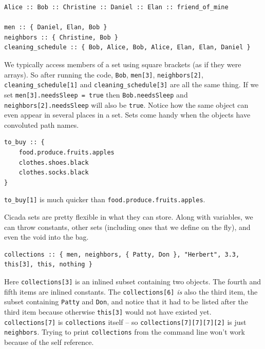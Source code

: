 \documentclass{article}
\newenvironment{code}{
       \begin{list}{}{
               \setlength{\leftmargin}{.4in}
               \setlength{\rightmargin}{0in}
               \setlength{\topsep}{.2in}
       }
       \small
       \item[] }
       { \end{list}   }
\begin{document}
\begin{code} \begin{verbatim}
Alice :: Bob :: Christine :: Daniel :: Elan :: friend_of_mine

men :: { Daniel, Elan, Bob }
neighbors :: { Christine, Bob }
cleaning_schedule :: { Bob, Alice, Bob, Alice, Elan, Elan, Daniel }
\end{verbatim} \end{code}

\noindent We typically access members of a set using square brackets (as if they were arrays).  So after running the code, \texttt{Bob}, \texttt{men[3]}, \texttt{neighbors[2]}, \texttt{cleaning\_schedule[1]} and \texttt{cleaning\_schedule[3]} are all the same thing.  If we set \verb#men[3].needsSleep = true# then \verb#Bob.needsSleep# and \verb#neighbors[2].needsSleep# will also be \verb#true#.  Notice how the same object can even appear in several places in a set.  Sets come handy when the objects have convoluted path names.

\begin{code} \begin{verbatim}
to_buy :: {
    food.produce.fruits.apples
    clothes.shoes.black
    clothes.socks.black
}
\end{verbatim} \end{code}

\noindent \verb#to_buy[1]# is much quicker than \texttt{food.produce.fruits.apples}.

Cicada sets are pretty flexible in what they can store.  Along with variables, we can throw constants, other sets (including ones that we define on the fly), and even the void into the bag.

\begin{code} \begin{verbatim}
collections :: { men, neighbors, { Patty, Don }, "Herbert", 3.3, this[3], this, nothing }
\end{verbatim} \end{code}

\noindent Here \verb#collections[3]# is an inlined subset containing two objects.  The fourth and fifth items are inlined constants.  The \verb#collections[6]# \emph{is} also the third item, the subset containing \verb#Patty# and \verb#Don#, and notice that it had to be listed after the third item because otherwise \texttt{this[3]} would not have existed yet.  \verb#collections[7]# is \verb#collections# itself -- so \verb#collections[7][7][7][2]# is just \verb#neighbors#.  Trying to print \verb#collections# from the command line won't work because of the self reference.
\end{document}
